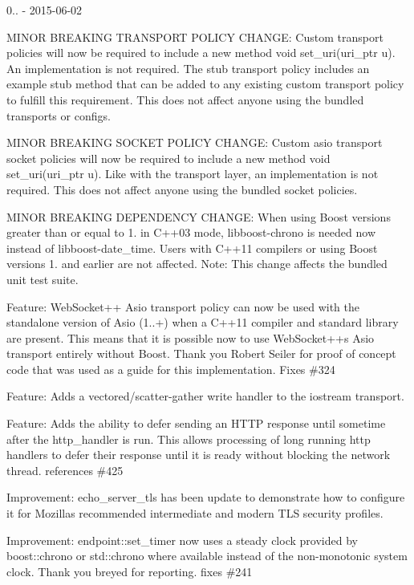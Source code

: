 0.. -\/ 2015-\/06-\/02
\begin{DoxyItemize}
\item M\+I\+N\+OR B\+R\+E\+A\+K\+I\+NG T\+R\+A\+N\+S\+P\+O\+RT P\+O\+L\+I\+CY C\+H\+A\+N\+GE\+: Custom transport policies will now be required to include a new method {\ttfamily void set\+\_\+uri(uri\+\_\+ptr u)}. An implementation is not required. The stub transport policy includes an example stub method that can be added to any existing custom transport policy to fulfill this requirement. This does not affect anyone using the bundled transports or configs.
\item M\+I\+N\+OR B\+R\+E\+A\+K\+I\+NG S\+O\+C\+K\+ET P\+O\+L\+I\+CY C\+H\+A\+N\+GE\+: Custom asio transport socket policies will now be required to include a new method {\ttfamily void set\+\_\+uri(uri\+\_\+ptr u)}. Like with the transport layer, an implementation is not required. This does not affect anyone using the bundled socket policies.
\item M\+I\+N\+OR B\+R\+E\+A\+K\+I\+NG D\+E\+P\+E\+N\+D\+E\+N\+CY C\+H\+A\+N\+GE\+: When using Boost versions greater than or equal to 1. in C++03 mode, {\ttfamily libboost-\/chrono} is needed now instead of {\ttfamily libboost-\/date\+\_\+time}. Users with C++11 compilers or using Boost versions 1. and earlier are not affected. Note\+: This change affects the bundled unit test suite.
\item Feature\+: Web\+Socket++ Asio transport policy can now be used with the standalone version of Asio (1..+) when a C++11 compiler and standard library are present. This means that it is possible now to use Web\+Socket++\textquotesingle{}s Asio transport entirely without Boost. Thank you Robert Seiler for proof of concept code that was used as a guide for this implementation. Fixes \#324
\item Feature\+: Adds a vectored/scatter-\/gather write handler to the iostream transport.
\item Feature\+: Adds the ability to defer sending an H\+T\+TP response until sometime after the {\ttfamily http\+\_\+handler} is run. This allows processing of long running http handlers to defer their response until it is ready without blocking the network thread. references \#425
\item Improvement\+: {\ttfamily echo\+\_\+server\+\_\+tls} has been update to demonstrate how to configure it for Mozilla\textquotesingle{}s recommended intermediate and modern T\+LS security profiles.
\item Improvement\+: {\ttfamily endpoint\+::set\+\_\+timer} now uses a steady clock provided by {\ttfamily boost\+::chrono} or {\ttfamily std\+::chrono} where available instead of the non-\/monotonic system clock. Thank you breyed for reporting. fixes \#241

\end{DoxyItemize}
